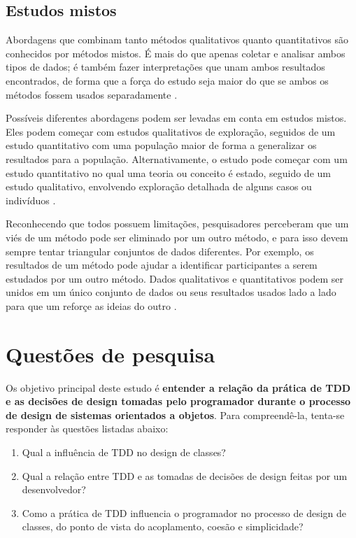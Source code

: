 \subsection{Estudos mistos}

Abordagens que combinam tanto métodos qualitativos quanto quantitativos são conhecidos por métodos mistos. 
É mais do que apenas coletar e analisar ambos tipos de dados; é também fazer interpretações que unam ambos
resultados encontrados, de forma que a força do estudo seja maior do que se ambos os métodos fossem
usados separadamente \cite{creswell}.

Possíveis diferentes abordagens podem ser levadas em conta em estudos mistos. Eles podem começar com estudos
qualitativos de exploração, seguidos de um estudo quantitativo com uma população maior de forma a
generalizar os resultados para a população. Alternativamente, o estudo pode começar com um estudo quantitativo
no qual uma teoria ou conceito é estado, seguido de um estudo qualitativo, envolvendo exploração detalhada
de alguns casos ou indivíduos \cite{creswell}.

Reconhecendo que todos possuem limitações, pesquisadores perceberam que um viés de um método pode ser eliminado
por um outro método, e para isso devem sempre tentar triangular conjuntos de dados diferentes.
Por exemplo, os resultados de um método pode ajudar a identificar participantes a serem estudados por um outro método.
Dados qualitativos e quantitativos podem ser unidos em um único conjunto de dados ou seus resultados usados
lado a lado para que um reforçe as ideias do outro \cite{creswell}.

\section{Questões de pesquisa}

Os objetivo principal deste estudo é \textbf{entender a relação da prática de TDD 
e as decisões de design tomadas pelo programador durante o processo de 
design de sistemas orientados a objetos}.
Para compreendê-la, tenta-se responder às questões listadas
abaixo:

\begin{enumerate}

	\item Qual a influência de TDD no design de classes?

	\item Qual a relação entre TDD e as tomadas de decisões de design
	feitas por um desenvolvedor?

	\item Como a prática de TDD influencia o programador no processo de  
	design de classes, do ponto de vista do acoplamento, coesão e simplicidade?

\end{enumerate}

